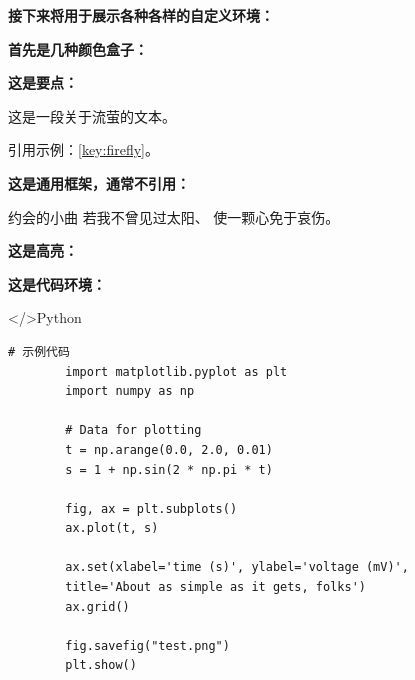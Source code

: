 \textbf{接下来将用于展示各种各样的自定义环境：}

\textbf{首先是几种颜色盒子：}

\textbf{这是要点：}

\begin{keypoint}[label=key:firefly]
	这是一段关于流萤的文本。
\end{keypoint}

引用示例：\cref{key:firefly}。

\textbf{这是通用框架，通常不引用：}

\begin{ubox}{约会的小曲}
	若我不曾见过太阳、
	使一颗心免于哀伤。
\end{ubox}

\textbf{这是高亮：}


\textbf{这是代码环境：}

\begin{macbox}{</>Python}
	\begin{lstlisting}[style=pythonstyle]
		# 示例代码
		import matplotlib.pyplot as plt
		import numpy as np
		
		# Data for plotting
		t = np.arange(0.0, 2.0, 0.01)
		s = 1 + np.sin(2 * np.pi * t)
		
		fig, ax = plt.subplots()
		ax.plot(t, s)
		
		ax.set(xlabel='time (s)', ylabel='voltage (mV)',
		title='About as simple as it gets, folks')
		ax.grid()
		
		fig.savefig("test.png")
		plt.show()
	\end{lstlisting}
\end{macbox}
